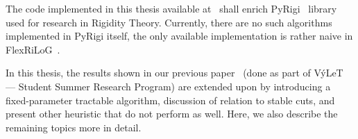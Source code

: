The code implemented in this thesis available at~\cite{my_code}
shall enrich PyRigi~\cite{pyrigi}
library used for research in Rigidity Theory.
Currently, there are no such algorithms implemented in PyRigi itself,
the only available implementation is rather naive in FlexRiLoG~\cite{flexrilog}.

In this thesis, the results shown in our previous paper~\cite{my_paper}
(done as part of VýLeT --- Student Summer Research Program)
are extended upon by introducing a fixed-parameter tractable algorithm,
discussion of relation to stable cuts,
and present other heuristic that do not perform as well.
Here, we also describe the remaining topics more in detail.

